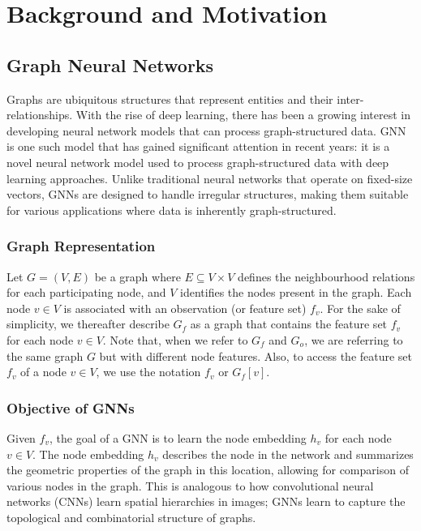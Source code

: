 \section{Background and Motivation}
\label{acsos2023:sec:background}
\subsection{Graph Neural Networks}

Graphs are ubiquitous structures that represent entities and their inter-relationships. With the rise of deep learning, there has been a growing interest in developing neural network models that can process graph-structured data. \ac{GNN} is one such model that has gained significant attention in recent years: it is a novel neural network model used to process graph-structured data with deep learning approaches. 
 Unlike traditional neural networks that operate on fixed-size vectors, \acp{GNN} are designed to handle irregular structures, 
 making them suitable for various applications where data is inherently graph-structured.

\subsubsection{Graph Representation}
Let $G = (V, E)$ be a graph where $E\subseteq V\times V$ defines the neighbourhood relations for each participating node, 
 and $V$ identifies the nodes present in the graph. 
 Each node $v \in V$ is associated with an observation (or feature set) $f_v$. For the sake of simplicity, 
 we thereafter describe $G_f$ as a graph that contains the feature set $f_v$ for each node $v \in V$. 
 Note that, when we refer to $G_f$ and $G_o$, 
 we are referring to the same graph $G$ but with different node features. 
 Also, to access the feature set $f_v$ of a node $v \in V$, we use the notation $f_v$ or $G_f[v]$.

\subsubsection{Objective of GNNs}

Given $f_v$, the goal of a \ac{GNN} is to learn the node embedding $h_v$ for each node $v \in V$. 
 The node embedding $h_v$ describes the node in the network and summarizes the geometric properties of the graph in this location, 
 allowing for comparison of various nodes in the graph. 
 This is analogous to how convolutional neural networks (CNNs) learn spatial hierarchies in images; 
 \acp{GNN} learn to capture the topological and combinatorial structure of graphs.

